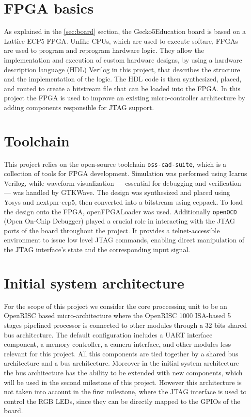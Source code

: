 \documentclass[a4paper,11pt,oneside]{report}
\newcommand{\boardName}{Gecko5Education \xspace}
\begin{document}
\section{FPGA basics}

As explained in the \ref{sec:board} section, the \boardName board is based on a Lattice ECP5 FPGA.
Unlike CPUs, which are used to execute softare, FPGAs are used to program and reprogram hardware logic. 
They allow the implementation and execution of custom hardware designs, by using a hardware description language (HDL)
 Verilog in this project, that describes the structure and the implementation of the logic. The HDL code is then synthesized,
 placed, and routed to create a bitstream file that can be loaded into the FPGA.
In this project the FPGA is used to improve an existing micro-controller architecture by adding components responsible for JTAG support.


\section{Toolchain}

This project relies on the open-source toolchain \texttt{oss-cad-suite}, which is a collection of tools for FPGA development.
Simulation was performed using Icarus Verilog, while waveform visualization — essential for debugging and verification — was handled by GTKWave. 
The design was synthesized and placed using Yosys and nextpnr-ecp5, then converted into a bitstream using ecppack. 
To load the design onto the FPGA, openFPGALoader was used.
Additionally \texttt{openOCD} (Open On-Chip Debugger) played a crucial role in interacting with the JTAG ports of the board throughout the project.
It provides a telnet-accessible environment to issue low level JTAG commands, enabling direct manipulation of the JTAG interface's state and the corresponding
 input signal.

\section{Initial system architecture}

For the scope of this project we consider the core proccessing unit to be 
an OpenRISC based micro-architecture where the OpenRISC 1000 ISA-based 5 stages pipelined processor is connected to other modules through a 32 bits shared bus architecture. 
The default configuration includes a UART interface component, a memory controller, a camera interface, and other modules less relevant for this project.
All this components are tied together by a shared bus architecture and a bus architecture. Moreover in the initial system architecture the bus architecture 
has the ability to be extended with new components, which will be used in the second milestone of this project.
However this architecture is not taken into account in the first milestone, where the JTAG interface is used to control the RGB LEDs, since they can be directly 
mapped to the GPIOs of the board.
\end{document}
